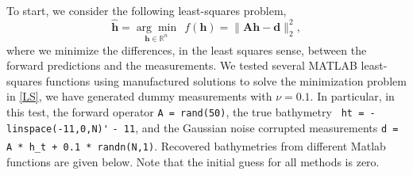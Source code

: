 To start,  we consider the following least-squares problem,
\begin{equation}\label{LS}
\mathbf{\hat{h}}= \underset{\mathbf{h} \in \mathbb{R}^n}{\arg \min} \ \ f(\mathbf{h}) = \|  \mathbf{A}\mathbf{h} -  \mathbf{d} \|_2^2,
\end{equation}
where we minimize the differences, in the least squares sense, between the forward predictions and the measurements. We tested several MATLAB least-squares functions using manufactured solutions to solve the minimization problem in  \eqref{LS}, we have generated dummy measurements with $\nu = 0.1$. In particular, in this test, the forward operator \verb|A = rand(50)|, the true bathymetry \verb| ht = -linspace(-11,0,N)'| \verb|- 11|, and the Gaussian noise corrupted measurements \verb|d = A * h_t + 0.1 * randn(N,1)|. Recovered bathymetries from different Matlab\textsuperscript{\textregistered} functions are given below. Note that the initial guess for all methods is zero. 
